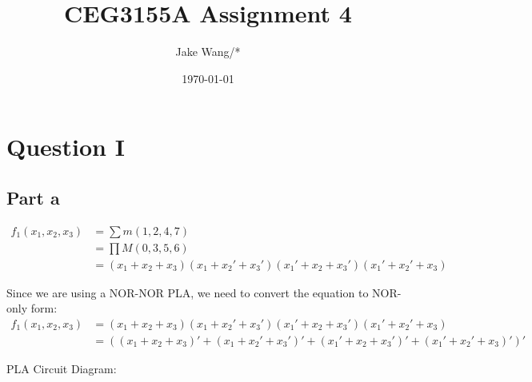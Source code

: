 \documentclass[12pt, a4paper]{article}
\title{CEG3155A Assignment 4}
\author{Jake Wang/*}
\date{\today}
\begin{document}
	\maketitle
	
	\section*{Question I}
	\subsection*{Part a}
	\begin{align*}
		f_1(x_1, x_2, x_3) &= \sum{m(1, 2, 4, 7)} \\
		&= \prod{M(0, 3, 5, 6)} \\
		&= (x_1 + x_2 + x_3)(x_1 + x_2' + x_3')(x_1' + x_2 + x_3')(x_1' + x_2' + x_3)
	\end{align*}
	
	Since we are using a NOR-NOR PLA, we need to convert the equation to
	NOR-only form:
	\begin{align*}
		f_1(x_1, x_2, x_3) &= (x_1 + x_2 + x_3)(x_1 + x_2' + x_3')(x_1' + x_2 + x_3')(x_1' + x_2' + x_3) \\
		&= ((x_1 + x_2 + x_3)' + (x_1 + x_2' + x_3')' + (x_1' + x_2 + x_3')' + (x_1' + x_2' + x_3)')'
	\end{align*}
	
	PLA Circuit Diagram:
	\begin{center}
	\end{center}
	
\end{document}
